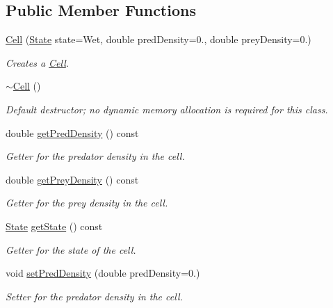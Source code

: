 \subsection*{Public Member Functions}
\begin{DoxyCompactItemize}
\item 
\hyperlink{class_cell_afc0a4cece64b7689425fa81a4f6ef2e2}{Cell} (\hyperlink{class_cell_a21d74a2efcb79c93e5649b06a50b7cf5}{State} state=Wet, double pred\+Density=0., double prey\+Density=0.)
\begin{DoxyCompactList}\small\item\em Creates a \hyperlink{class_cell}{Cell}. \end{DoxyCompactList}\item 
\mbox{\label{class_cell_a9fa559f7a28e2b4336c6879ca09304d8}} 
\hyperlink{class_cell_a9fa559f7a28e2b4336c6879ca09304d8}{$\sim$\+Cell} ()
\begin{DoxyCompactList}\small\item\em Default destructor; no dynamic memory allocation is required for this class. \end{DoxyCompactList}\item 
double \hyperlink{class_cell_af5ff36a4a4025053127a4ad77efb103f}{get\+Pred\+Density} () const
\begin{DoxyCompactList}\small\item\em Getter for the predator density in the cell. \end{DoxyCompactList}\item 
double \hyperlink{class_cell_a0756af1c045a1488e2b4c2c16d87eec2}{get\+Prey\+Density} () const
\begin{DoxyCompactList}\small\item\em Getter for the prey density in the cell. \end{DoxyCompactList}\item 
\hyperlink{class_cell_a21d74a2efcb79c93e5649b06a50b7cf5}{State} \hyperlink{class_cell_ab8c8914c6eb76fa53c4e77e692792435}{get\+State} () const
\begin{DoxyCompactList}\small\item\em Getter for the state of the cell. \end{DoxyCompactList}\item 
void \hyperlink{class_cell_adfd2fa8a4b91e18ca6195f34dbf00546}{set\+Pred\+Density} (double pred\+Density=0.)
\begin{DoxyCompactList}\small\item\em Setter for the predator density in the cell. \end{DoxyCompactList}\item 

\end{DoxyCompactItemize}

